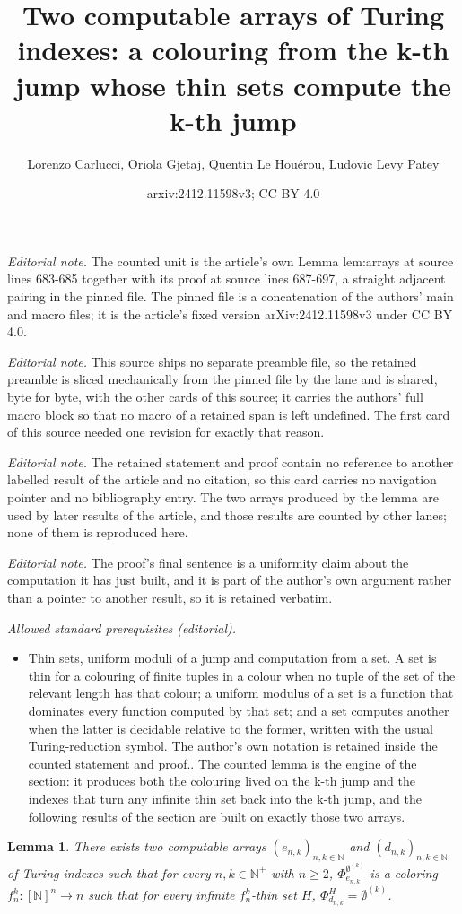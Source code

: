 \documentclass{article}
\title{Two computable arrays of Turing indexes: a colouring from the k-th jump whose thin sets compute the k-th jump}
\author{Lorenzo Carlucci, Oriola Gjetaj, Quentin Le Houérou, Ludovic Levy Patey}
\date{arxiv:2412.11598v3; CC BY 4.0}
\newcommand{\NN}[0]{\mathbb{N}}
\numberwithin{theorem}{section}
\newtheorem{lemma}[theorem]{Lemma}
\begin{document}
\maketitle
\noindent\textit{Editorial note.} The counted unit is the article's own Lemma lem:arrays at source lines 683-685 together with its proof at source lines 687-697, a straight adjacent pairing in the pinned file. The pinned file is a concatenation of the authors' main and macro files; it is the article's fixed version arXiv:2412.11598v3 under CC BY 4.0.\par\medskip
\noindent\textit{Editorial note.} This source ships no separate preamble file, so the retained preamble is sliced mechanically from the pinned file by the lane and is shared, byte for byte, with the other cards of this source; it carries the authors' full macro block so that no macro of a retained span is left undefined. The first card of this source needed one revision for exactly that reason.\par\medskip
\noindent\textit{Editorial note.} The retained statement and proof contain no reference to another labelled result of the article and no citation, so this card carries no navigation pointer and no bibliography entry. The two arrays produced by the lemma are used by later results of the article, and those results are counted by other lanes; none of them is reproduced here.\par\medskip
\noindent\textit{Editorial note.} The proof's final sentence is a uniformity claim about the computation it has just built, and it is part of the author's own argument rather than a pointer to another result, so it is retained verbatim.\par\medskip
\noindent\textit{Allowed standard prerequisites (editorial).}\begin{itemize}
\item Thin sets, uniform moduli of a jump and computation from a set. A set is thin for a colouring of finite tuples in a colour when no tuple of the set of the relevant length has that colour; a uniform modulus of a set is a function that dominates every function computed by that set; and a set computes another when the latter is decidable relative to the former, written with the usual Turing-reduction symbol. The author's own notation is retained inside the counted statement and proof.. The counted lemma is the engine of the section: it produces both the colouring lived on the k-th jump and the indexes that turn any infinite thin set back into the k-th jump, and the following results of the section are built on exactly those two arrays.
\end{itemize}\medskip
\begin{lemma}\label{lem:arrays}
    There exists two computable arrays $(e_{n,k})_{n,k \in \NN}$ and $(d_{n,k})_{n,k \in \NN}$ of Turing indexes such that for every $n, k \in \NN^+$ with $n \geq 2$, $\Phi_{e_{n,k}}^{\emptyset^{(k)}}$ is a coloring $f_n^k : [\NN]^{n} \to n$ such that for every infinite $f_n^k$-thin set $H$, $\Phi_{d_{n,k}}^{H} = \emptyset^{(k)}$.
\end{lemma}
\end{document}
